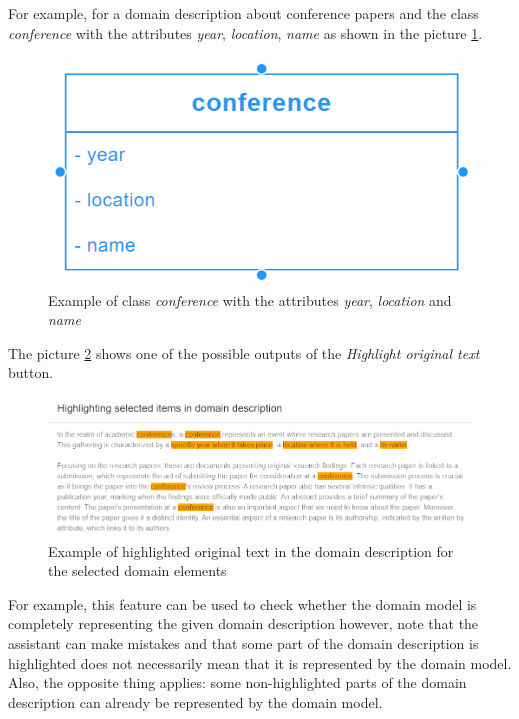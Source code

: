 For example, for a domain description about conference papers and the class \textit{conference} with the attributes \textit{year}, \textit{location}, \textit{name} as shown in the picture \ref{fig:class_example}.

\begin{figure}[!h]
    \includegraphics[scale=0.29]{../docs/images/frontend/class-example.png}
    \caption{\centering Example of class \textit{conference} with the attributes \textit{year}, \textit{location} and \textit{name}}
    \label{fig:class_example}
\end{figure}

The picture \ref{fig:highlight_all_example} shows one of the possible outputs of the \textit{Highlight original text} button.

\begin{figure}[!h]
    \includegraphics[scale=0.4]{../docs/images/frontend/highlight-all-example.png}
    \caption{\centering Example of highlighted original text in the domain description for the selected domain elements}
    \label{fig:highlight_all_example}
\end{figure}


For example, this feature can be used to check whether the domain model is completely representing the given domain description however, note that the assistant can make mistakes and that some part of the domain description is highlighted does not necessarily mean that it is represented by the domain model. Also, the opposite thing applies: some non-highlighted parts of the domain description can already be represented by the domain model.

